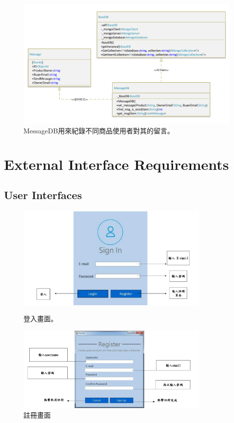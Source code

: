 \documentclass{scrreprt}
\begin{document}
\begin{CJK}{UTF8}{bkai}
\begin{figure}
	\includegraphics[width=\textwidth]{MessageDB.pdf}
	\caption{MessageDB用來紀錄不同商品使用者對其的留言。}
\end{figure}


\chapter{External Interface Requirements}

\section{User Interfaces}
\begin{figure}[h]
	\centering
	\includegraphics[width=0.85\textwidth]{signin.pdf}
	\caption{登入畫面。}
	\centering
	\includegraphics[width=0.85\textwidth]{register.pdf}
	\caption{註冊畫面}
\end{figure}


\end{CJK}
\end{document}
